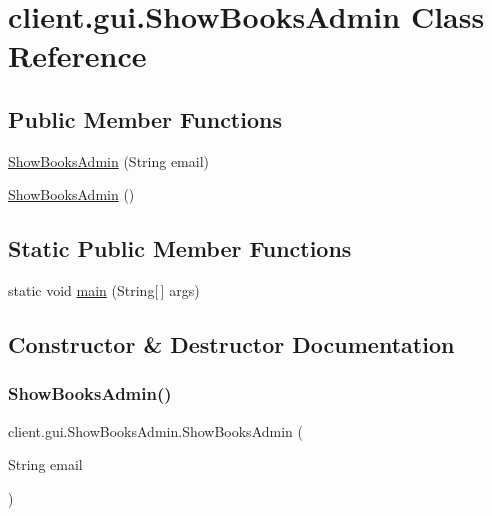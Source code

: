 \hypertarget{classclient_1_1gui_1_1_show_books_admin}{}\section{client.\+gui.\+Show\+Books\+Admin Class Reference}
\label{classclient_1_1gui_1_1_show_books_admin}
\subsection*{Public Member Functions}
\begin{DoxyCompactItemize}
\item 
\hyperlink{classclient_1_1gui_1_1_show_books_admin_a418811ec00cf5eec2311a4f8d0bd2bbe}{Show\+Books\+Admin} (String email)
\item 
\hyperlink{classclient_1_1gui_1_1_show_books_admin_a3cd50eea77571b56d9586c897bca3649}{Show\+Books\+Admin} ()
\end{DoxyCompactItemize}
\subsection*{Static Public Member Functions}
\begin{DoxyCompactItemize}
\item 
static void \hyperlink{classclient_1_1gui_1_1_show_books_admin_aa020e3fa7d5aef20d7ab4bff2164fa75}{main} (String\mbox{[}$\,$\mbox{]} args)
\end{DoxyCompactItemize}


\subsection{Constructor \& Destructor Documentation}
\mbox{\label{classclient_1_1gui_1_1_show_books_admin_a418811ec00cf5eec2311a4f8d0bd2bbe}} 
\subsubsection{\texorpdfstring{Show\+Books\+Admin()}{ShowBooksAdmin()}\hspace{0.1cm}{\footnotesize\ttfamily [1/2]}}
{\footnotesize\ttfamily client.\+gui.\+Show\+Books\+Admin.\+Show\+Books\+Admin (\begin{DoxyParamCaption}\item[{String}]{email }\end{DoxyParamCaption})}

